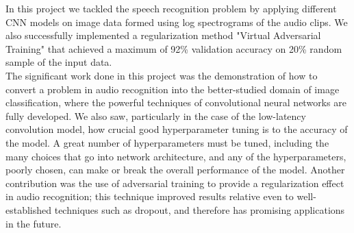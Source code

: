 \documentclass{article}
\theoremstyle{definition}
\theoremstyle{remark}
\begin{document}
In this project we tackled the speech recognition problem by applying different CNN models on image data formed using log spectrograms of the audio clips. We also successfully implemented a regularization method "Virtual Adversarial Training" that achieved a maximum of 92\% validation accuracy on 20\% random sample of
the input data.\\
The significant work done in this project was the demonstration of how to convert a problem in audio recognition into the better-studied domain of image classification, where the powerful techniques of convolutional neural networks are fully developed.
We also saw, particularly in the case of the low-latency convolution model, how crucial good hyperparameter tuning is to the accuracy of the model. A great number of hyperparameters must be tuned, including the many choices that go into network architecture, and any of the hyperparameters, poorly chosen, can make or break the overall performance of the model. Another contribution was the use of adversarial training to provide a regularization effect in audio recognition; this technique improved results relative even to well-established techniques such as dropout, and therefore has promising applications in the future.
\end{document}
